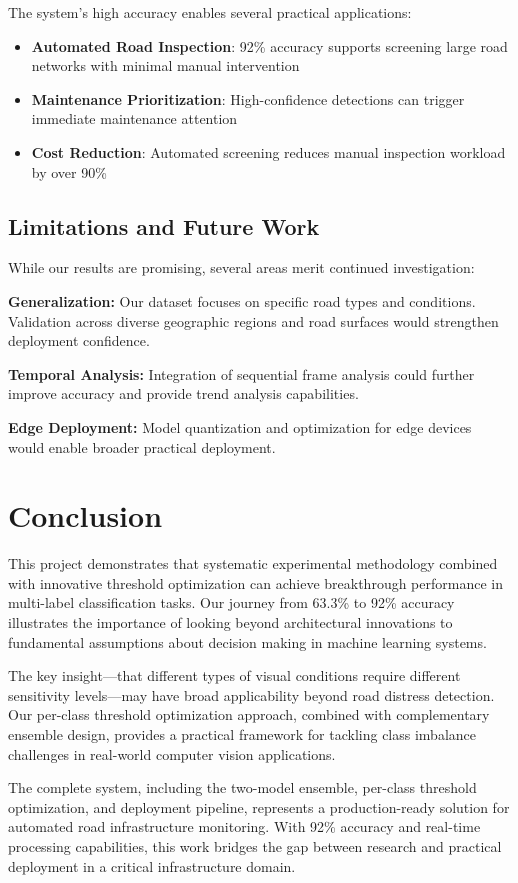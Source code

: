 \documentclass[12pt]{article}
\begin{document}
The system's high accuracy enables several practical applications:

\begin{itemize}[itemsep=1pt,parsep=0pt,topsep=3pt]
\item \textbf{Automated Road Inspection}: 92\% accuracy supports screening large road networks with minimal manual intervention
\item \textbf{Maintenance Prioritization}: High-confidence detections can trigger immediate maintenance attention
\item \textbf{Cost Reduction}: Automated screening reduces manual inspection workload by over 90\%
\end{itemize}

\subsection{Limitations and Future Work}

While our results are promising, several areas merit continued investigation:

\textbf{Generalization:} Our dataset focuses on specific road types and conditions. Validation across diverse geographic regions and road surfaces would strengthen deployment confidence.

\textbf{Temporal Analysis:} Integration of sequential frame analysis could further improve accuracy and provide trend analysis capabilities.

\textbf{Edge Deployment:} Model quantization and optimization for edge devices would enable broader practical deployment.

\section{Conclusion}

This project demonstrates that systematic experimental methodology combined with innovative threshold optimization can achieve breakthrough performance in multi-label classification tasks. Our journey from 63.3\% to 92\% accuracy illustrates the importance of looking beyond architectural innovations to fundamental assumptions about decision making in machine learning systems.

The key insight—that different types of visual conditions require different sensitivity levels—may have broad applicability beyond road distress detection. Our per-class threshold optimization approach, combined with complementary ensemble design, provides a practical framework for tackling class imbalance challenges in real-world computer vision applications.

The complete system, including the two-model ensemble, per-class threshold optimization, and deployment pipeline, represents a production-ready solution for automated road infrastructure monitoring. With 92\% accuracy and real-time processing capabilities, this work bridges the gap between research and practical deployment in a critical infrastructure domain.
\end{document}
